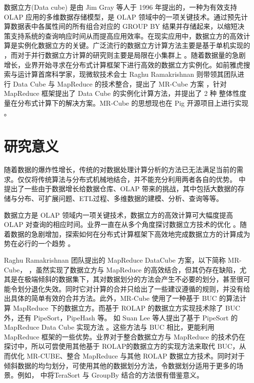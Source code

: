 数据立方(Data cube) \cite{gray1997data}是由 Jim Gray 等人于 1996 年提出的，一种为有效支持 OLAP 应用的多维数据存储模型，是 OLAP 领域中的一项关键技术。通过预先计算数据表中各属性间的所有组合对应的 GROUP BY 结果并存储起来，以缩短决策支持系统的查询响应时间从而提高应用效率。在现实应用中，数据立方的高效计算是实例化数据立方的关键。广泛流行的数据立方计算方法主要是基于单机实现的 \cite{agarwal1996computation} \cite{beyer1999bottom}，而对于并行数据立方计算的研究则主要是局限在小集群上 \cite{ng2001iceberg} \cite{dehne2002parallelizing}。随着数据量的急剧增长，业界开始寻求在分布式计算框架下进行高效的数据立方实例化。如前雅虎搜索与运计算首席科学家，现微软技术会士 Raghu Ramakrishnan 则带领其团队进行 Data Cube 与 MapReduce 的技术整合，提出了 MR-Cube 方案 \cite{nandi2012data} \cite{nandi2011distributed}，针对 MapReduce 框架提出了 Data Cube 的实例化计算方法，并提出了 2 种 整体性度量在分布式计算下的解决方案。MR-Cube 的思想现也在 Pig 开源项目上进行实现 \cite{mrcubepig}。

\section{研究意义}

随着数据的爆炸性增长，传统的对数据处理计算分析的方法已无法满足当前的需求。仅仅将传统算法与分布式机械地结合，并不能充分利用两者各自的优势。\cite{cuzzocrea2011analytics} \cite{cuzzocrea2013data} \cite{cuzzocrea2013big} 中提出了一些由于数据增长给数据仓库、OLAP 带来的挑战，其中包括大数据的存储与分布、可扩展问题、ETL过程、多维数据的建模、分析、查询等等。

数据立方是 OLAP 领域内一项关键技术，数据立方的高效计算可大幅度提高 OLAP 对查询的相应时间。业界一直在从多个角度探讨数据立方技术的优化 \cite{xin2003star} \cite{harinarayan1996implementing} \cite{zhao1997array} \cite{han2001efficient} \cite{wang2002condensed}。随着数据的急剧增加，探索如何在分布式计算框架下高效地完成数据立方的计算成为势在必行的一个趋势 \cite{abello2011building} \cite{wang2010mapreducemerge} \cite{sergey2009applying} \cite{lee2012efficient} \cite{wang2013scalable}。

Raghu Ramakrishnan 团队提出的 MapReduce DataCube 方案，以下简称 MR-Cube， \cite{nandi2012data} \cite{nandi2011distributed}，虽然实现了数据立方与 MapReduce 的高效结合，但其仍存在缺陷，尤其是在极端倾斜的数据集下，其对数据划分的方法会产生不必要的划分，甚至很可能令划分退化失效。同时它对计算的合并只给出了一些建议遵循的规则，并没有给出具体的简单有效的合并方法。此外，MR-Cube 使用了一种基于 BUC \cite{beyer1999bottom} 的算法计算 MapReduce 下的数据立方。而基于 ROLAP 的数据立方实现技术除了 BUC 外，还有 PipeSort，PipeHash \cite{agarwal1996computation} 等。 如 Suan Lee 等人提出了基于 PipeSort 的 MapReduce Data Cube 实现方法 \cite{lee2012efficient} 。这些方法与 BUC 相比，更能利用 MapReduce 框架的一些优势。业界对于整合数据立方与 MapReduce 的技术仍在探讨中，所以可尝使用其他基于 ROLAP的数据立方的实现方法来取代 BUC，从而优化 MR-CUBE、整合 MapReduce 与其他 ROLAP 数据立方技术。同时对于倾斜数据的均匀划分，可使用其他的数据划分方法，令数据划分适用于更多的场景。例如，\cite{tao2013minimal} 中将TeraSort 与 GroupBy 结合的方法很有借鉴意义。




